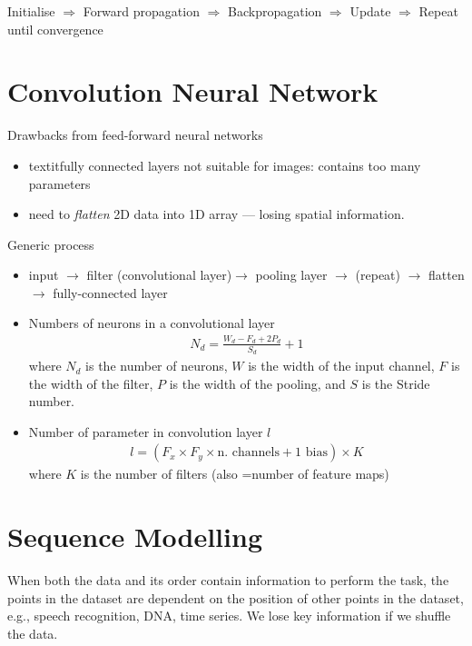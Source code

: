 \documentclass[a4paper,10pt]{article}
\begin{document}
Initialise $\Rightarrow$ Forward propagation $\Rightarrow$ Backpropagation $\Rightarrow$ Update $\Rightarrow$ Repeat until convergence



\section{Convolution Neural Network}
Drawbacks from feed-forward neural networks 
\begin{itemize}
    \item textit{fully connected} layers not suitable for images: contains too many parameters  
    \item need to \textit{flatten} 2D data into 1D array --- losing spatial information. 
\end{itemize}

Generic process
\begin{itemize}
    \item input $\rightarrow$ filter (convolutional layer)$\rightarrow$ pooling layer $\rightarrow$ (repeat) $\rightarrow$ flatten $\rightarrow$ fully-connected layer
    \item Numbers of neurons in a convolutional layer
        \begin{gather*}
            N_d = \frac{W_d-F_d+2P_d}{S_d}+1
        \end{gather*}
    where $N_d$ is the number of neurons, $W$ is the width of the input channel, $F$ is the width of the filter, $P$ is the width of the pooling, and $S$ is the Stride number. 
    \item Number of parameter in convolution layer $l$
        \begin{gather*}
            l = (F_x\times F_y\times \text{n. channels} + 1 \text{ bias})\times K
        \end{gather*}
    where $K$ is the number of filters (also =number of feature maps)
\end{itemize}



\section{Sequence Modelling}
When both the data and its order contain information to perform the task, the points in the dataset are dependent on the position of other points in the dataset, e.g., speech recognition, DNA, time series. We lose key information if we shuffle the data.
\end{document}
